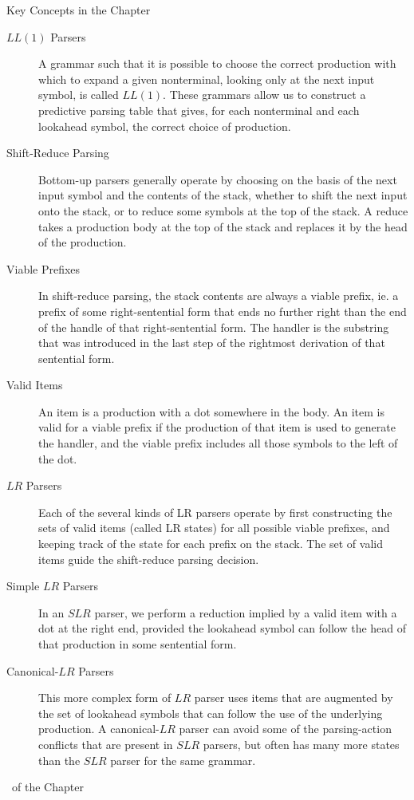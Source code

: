 \begin{bibunit}[apalike]
\begin{frame}[t,allowframebreaks]{Key Concepts in the Chapter}
\begin{small}
\begin{description}
	\item[$LL(1)$ Parsers] A grammar such that it is possible to choose the correct production with which to expand a given nonterminal, looking only at the next input symbol, is called $LL(1)$. These grammars allow us to construct a predictive parsing table that gives, for each nonterminal and each lookahead symbol, the correct choice of production.
	\item[Shift-Reduce Parsing] Bottom-up parsers generally operate by choosing on the basis of the next input symbol and the contents of the stack, whether to shift the next input onto the stack, or to reduce some symbols at the top of the stack. A reduce takes a production body at the top of the stack and replaces it by the head of the production.
	\item[Viable Prefixes] In shift-reduce parsing, the stack contents are always a viable prefix, ie. a prefix of some right-sentential form that ends no further right than the end of the handle of that right-sentential form. The handler is the substring that was introduced in the last step of the rightmost derivation of that sentential form.
	\item[Valid Items] An item is a production with a dot somewhere in the body. An item is valid for a viable prefix if the production of that item is used to generate the handler, and the viable prefix includes all those symbols to the left of the dot.
	\item[$LR$ Parsers] Each of the several kinds of LR parsers operate by first constructing the sets of valid items (called LR states) for all possible viable prefixes, and keeping track of the state for each prefix on the stack. The set of valid items guide the shift-reduce parsing decision.
	\item[Simple $LR$ Parsers] In an $SLR$ parser, we perform a reduction implied by a valid item with a dot at the right end, provided the lookahead symbol can follow the head of that production in some sentential form.
	\item[Canonical-$LR$ Parsers] This more complex form of $LR$ parser uses items that are augmented by the set of lookahead symbols that can follow the use of the underlying production. A canonical-$LR$ parser can avoid some of the parsing-action conflicts that are present in $SLR$ parsers, but often has many more states than the $SLR$ parser for the same grammar.
	\end{description}
	\end{small}
\end{frame}

\begin{frame}[t,allowframebreaks]{\bibname\ of the Chapter}%
	\tiny%
\end{frame}%

\end{bibunit}
